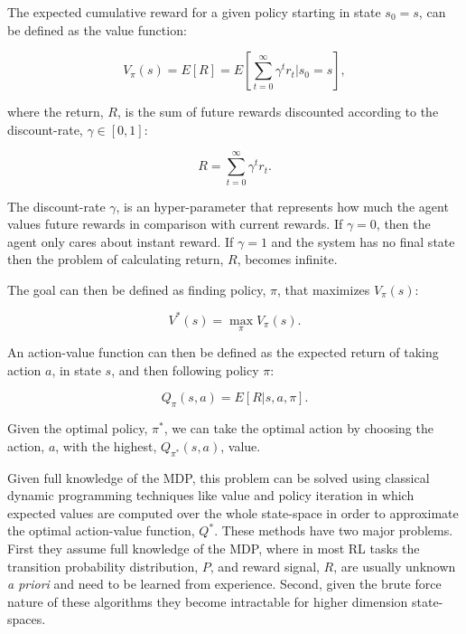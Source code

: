 The expected cumulative reward for a given policy starting in state $s_0=s$, can be defined as the value function:

\begin{equation}\label{Vfunction}
V_{\pi}(s)=E[R]=E[\sum\limits_{t=0}^\infty \gamma^t r_t | s_0 = s],
\end{equation}

where the return, $R$, is the sum of future rewards discounted according to the discount-rate, $\gamma \in [0, 1]$:

\begin{equation} \label{return_func}
R = \sum\limits_{t=0}^\infty \gamma^t r_t .
\end{equation}

The discount-rate $\gamma$, is an hyper-parameter that represents how much the agent values future rewards in comparison with current rewards. If $\gamma=0$, then the agent only cares about instant reward. If $\gamma=1$ and the system has no final state then the problem of calculating return, $R$, becomes infinite.

The goal can then be defined as finding policy, $\pi$, that maximizes $V_\pi(s)$:

\begin{equation} \label{maximizes_expected}
V^*(s)=\max\limits_{\pi}V_\pi(s) .
\end{equation}

An action-value function can then be defined as the expected return of taking action $a$, in state $s$, and then following policy $\pi$:

\begin{equation}
Q_\pi(s,a) = E[R|s, a, \pi] .
\end{equation}

Given the optimal policy, $\pi^*$, we can take the optimal action by choosing the action, $a$, with the highest, $Q_{\pi^*}(s,a)$, value. 

Given full knowledge of the \acrshort{MDP}, this problem can be solved using classical dynamic programming techniques like value and policy iteration in which expected values are computed over the whole state-space in order to approximate the optimal action-value function, $Q^*$. These methods have two major problems. First they assume full knowledge of the \acrshort{MDP}, where in most \acrshort{RL} tasks the transition probability distribution, $P$, and reward signal, $R$, are usually unknown \emph{a priori} and need to be learned from experience. Second, given the brute force nature of these algorithms they become intractable for higher dimension state-spaces.

